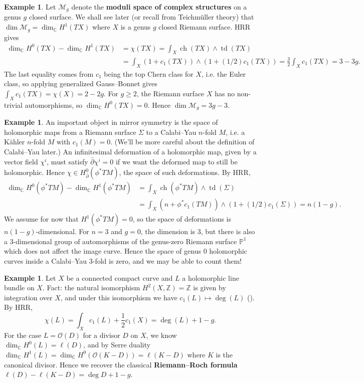 \documentclass{report}
\theoremstyle{plain}
\theoremstyle{definition}
\newtheorem{example}[theorem]{Example}
\theoremstyle{remark}
\newcommand{\di}{\partial}
\newcommand{\bC}{\mathbb{C}}
\newcommand{\bP}{\mathbb{P}}
\newcommand{\bZ}{\mathbb{Z}}
\newcommand{\cM}{\mathcal{M}}
\newcommand{\cO}{\mathcal{O}}
\DeclareMathOperator{\ch}{ch}
\DeclareMathOperator{\td}{td}
\newcommand{\bdi}{\bar{\di}}
\begin{document}
\begin{example} \label{ex:dim-of-moduli-space-riemann-surfaces}
  Let $\cM_g$ denote the {\bf moduli space of complex structures} on a
  genus $g$ closed surface. We shall see later (or recall from
  Teichm\"uller theory) that $\dim \cM_g = \dim_{\bC} H^1(TX)$ where
  $X$ is a genus $g$ closed Riemann surface. HRR gives
  \begin{align*}
    \dim_{\bC} H^0(TX) - \dim_{\bC} H^1(TX)
    &= \chi(TX) = \int_X \ch(TX) \wedge \td(TX) \\
    &= \int_X (1 + c_1(TX)) \wedge (1 + (1/2)c_1(TX))
    = \frac{3}{2} \int_X c_1(TX) = 3 - 3g.
  \end{align*}
  The last equality comes from $c_1$ being the top Chern class for
  $X$, i.e. the Euler class, so applying generalized Gauss--Bonnet
  gives $\int_X c_1(TX) = \chi(X) = 2 - 2g$. For $g \ge 2$, the
  Riemann surface $X$ has no non-trivial automorphisms, so $\dim_{\bC}
  H^0(TX) = 0$. Hence $\dim \cM_g = 3g - 3$.
\end{example}

\begin{example} \label{ex:dim-of-curves-in-calabi-yau}
  An important object in mirror symmetry is the space of holomorphic
  maps from a Riemann surface $\Sigma$ to a Calabi--Yau $n$-fold $M$,
  i.e. a K\"ahler $n$-fold $M$ with $c_1(M) = 0$. (We'll be more
  careful about the definition of Calabi--Yau later.) An infinitesimal
  deformation of a holomorphic map, given by a vector field $\chi^i$,
  must satisfy $\bdi \chi^i = 0$ if we want the deformed map to still
  be holomorphic. Hence $\chi \in H^0_{\bdi}(\phi^* TM)$, the space of
  such deformations. By HRR,
  \begin{align*}
    \dim_{\bC} H^0(\phi^*TM) - \dim_{\bC} H^1(\phi^*TM)
    &= \int_X \ch(\phi^*TM) \wedge \td(\Sigma) \\
    &= \int_X (n + \phi^*c_1(TM)) \wedge (1 + (1/2)c_1(\Sigma)) = n(1-g).
  \end{align*}
  We assume for now that $H^1(\phi^* TM) = 0$, so the space of
  deformations is $n(1-g)$-dimensional. For $n = 3$ and $g = 0$, the
  dimension is $3$, but there is also a $3$-dimensional group of
  automorphisms of the genus-zero Riemann surface $\bP^1$ which does
  not affect the image curve. Hence the space of genus $0$ holomorphic
  curves inside a Calabi--Yau $3$-fold is zero, and we may be able to
  count them!
\end{example}

\begin{example}
  Let $X$ be a connected compact curve and $L$ a holomorphic line
  bundle on $X$. Fact: the natural isomorphism $H^2(X, \bZ) = \bZ$ is
  given by integration over $X$, and under this isomorphism we have
  $c_1(L) \mapsto \deg(L)$ (\cite[Exercise 4.4.1]{Huybrechts2005}). By
  HRR,
  \[ \chi(L) = \int_X c_1(L) + \frac{1}{2} c_1(X) = \deg(L) + 1 - g. \]
  For the case $L = \cO(D)$ for a divisor $D$ on $X$, we know
  $\dim_{\bC} H^0(L) = \ell(D)$, and by Serre duality $\dim_{\bC}
  H^1(L) = \dim_{\bC} H^0(\cO(K - D)) = \ell(K - D)$ where $K$ is the
  canonical divisor. Hence we recover the classical {\bf Riemann--Roch
    formula} $\ell(D) - \ell(K-D) = \deg D + 1 - g$.
\end{example}
\end{document}
